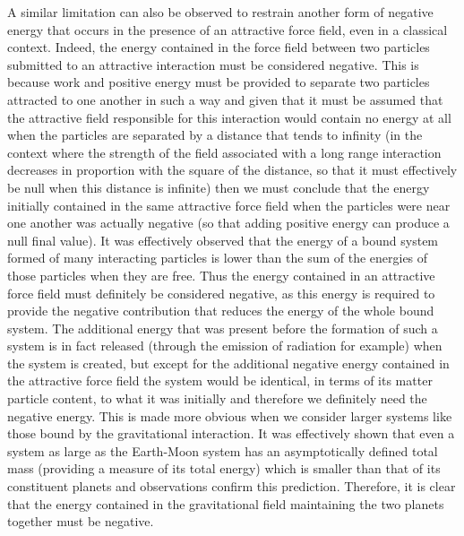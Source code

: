 \documentclass[notitlepage,12pt]{report}
\begin{document}
A similar limitation can also be observed to restrain another form of negative energy that occurs in the presence of an attractive force field, even in a classical context. Indeed, the energy contained in the force field between two particles submitted to an attractive interaction must be considered negative. This is because work and positive energy must be provided to separate two particles attracted to one another in such a way and given that it must be assumed that the attractive field responsible for this interaction would contain no energy at all when the particles are separated by a distance that tends to infinity (in the context where the strength of the field associated with a long range interaction decreases in proportion with the square of the distance, so that it must effectively be null when this distance is infinite) then we must conclude that the energy initially contained in the same attractive force field when the particles were near one another was actually negative (so that adding positive energy can produce a null final value). It was effectively observed that the energy of a bound system formed of many interacting particles is lower than the sum of the energies of those particles when they are free. Thus the energy contained in an attractive force field must definitely be considered negative, as this energy is required to provide the negative contribution that reduces the energy of the whole bound system. The additional energy that was present before the formation of such a system is in fact released (through the emission of radiation for example) when the system is created, but except for the additional negative energy contained in the attractive force field the system would be identical, in terms of its matter particle content, to what it was initially and therefore we definitely need the negative energy. This is made more obvious when we consider larger systems like those bound by the gravitational interaction. It was effectively shown that even a system as large as the Earth-Moon system has an asymptotically defined total mass (providing a measure of its total energy) which is smaller than that of its constituent planets and observations confirm this prediction. Therefore, it is clear that the energy contained in the gravitational field maintaining the two planets together must be negative.
\end{document}
